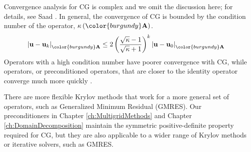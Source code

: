 Convergence analysis for CG is complex and we omit the discussion here; for details, see Saad \cite{saad2003iterative}.
In general, the convergence of CG is bounded by the condition number of the operator, $\kappa \left( {\color{burgundy}\mathbf{A}} \right)$.
\begin{equation}
\left\lvert \mathbf{u} - \mathbf{u}_k \right\rvert_{\color{burgundy}\mathbf{A}} \leq 2 \left( \frac{\sqrt{\kappa} - 1}{\sqrt{\kappa} + 1} \right)^k \left\lvert \mathbf{u} - \mathbf{u}_0 \right\rvert_{\color{burgundy}\mathbf{A}}
\end{equation}
Operators with a high condition number have poorer convergence with CG, while operators, or preconditioned operators, that are closer to the identity operator converge much more quickly \cite{golub1989matrix}.

There are more flexible Krylov methods that work for a more general set of operators, such as Generalized Minimum Residual (GMRES).
Our preconditioners in Chapter \ref{ch:MultigridMethods} and Chapter \ref{ch:DomainDecomposition} maintain the symmetric positive-definite property required for CG, but they are also applicable to a wider range of Krylov methods or iterative solvers, such as GMRES.